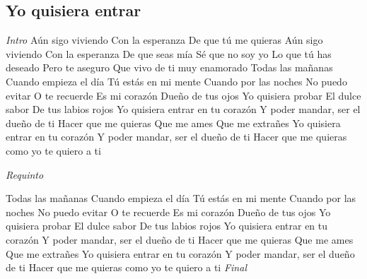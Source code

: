 \subsection{Yo quisiera entrar}
\noindent

\vspace{1cm}

\begin{guitar}
	\begin{multicols}{2}
		\textit{Intro}
	Aún sigo viviendo
	Con la esperanza
	De que tú me quieras
	Aún sigo viviendo
	Con la esperanza
	De que seas mía
	Sé que no soy yo
	Lo que tú has deseado
	Pero te aseguro
	Que vivo de ti muy enamorado
	Todas las mañanas
	Cuando empieza el día
	Tú estás en mi mente
	Cuando por las noches
	No puedo evitar
	O te recuerde
	Es mi corazón
	Dueño de tus ojos
	Yo quisiera probar
	El dulce sabor
	De tus labios rojos
	Yo quisiera entrar en tu corazón
	Y poder mandar, ser el dueño de ti
	Hacer que me quieras
	Que me ames
	Que me extrañes
	Yo quisiera entrar en tu corazón
	Y poder mandar, ser el dueño de ti
	Hacer que me quieras como yo te quiero a ti

	\par
	\textit{Requinto}
	\par

	Todas las mañanas
	Cuando empieza el día
	Tú estás en mi mente
	Cuando por las noches
	No puedo evitar
	O te recuerde
	Es mi corazón
	Dueño de tus ojos
	Yo quisiera probar
	El dulce sabor
	De tus labios rojos
	Yo quisiera entrar en tu corazón
	Y poder mandar, ser el dueño de ti
	Hacer que me quieras
	Que me ames
	Que me extrañes
	Yo quisiera entrar en tu corazón
	Y poder mandar, ser el dueño de ti
	Hacer que me quieras como yo te quiero a ti
		\textit{Final}
	\end{multicols}
\end{guitar}
